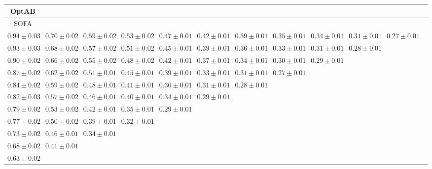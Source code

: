 \begin{table}[ht]
{{\begin{adjustbox}{width=\textwidth}
\begin{tabular}{cccccccccccc}
\hline
OptAB &  &  &  &  &  &  &  &  &  & \\
\hline
SOFA &  &  &  &  &  &  &  &  &  & \\
\hline
$0.94 \pm 0.03$ & $0.70 \pm 0.02$ & $0.59 \pm 0.02$ & $0.53 \pm 0.02$ & $0.47 \pm 0.01$ & $0.42 \pm 0.01$ & $0.39 \pm 0.01$ & $0.35 \pm 0.01$ & $0.34 \pm 0.01$ & $0.31 \pm 0.01$ & $0.27 \pm 0.01$ &  \\
$0.93 \pm 0.03$ & $0.68 \pm 0.02$ & $0.57 \pm 0.02$ & $0.51 \pm 0.02$ & $0.45 \pm 0.01$ & $0.39 \pm 0.01$ & $0.36 \pm 0.01$ & $0.33 \pm 0.01$ & $0.31 \pm 0.01$ & $0.28 \pm 0.01$ &  &  \\
$0.90 \pm 0.02$ & $0.66 \pm 0.02$ & $0.55 \pm 0.02$ & $0.48 \pm 0.02$ & $0.42 \pm 0.01$ & $0.37 \pm 0.01$ & $0.34 \pm 0.01$ & $0.30 \pm 0.01$ & $0.29 \pm 0.01$ &  &  &  \\
$0.87 \pm 0.02$ & $0.62 \pm 0.02$ & $0.51 \pm 0.01$ & $0.45 \pm 0.01$ & $0.39 \pm 0.01$ & $0.33 \pm 0.01$ & $0.31 \pm 0.01$ & $0.27 \pm 0.01$ &  &  &  &  \\
$0.84 \pm 0.02$ & $0.59 \pm 0.02$ & $0.48 \pm 0.01$ & $0.41 \pm 0.01$ & $0.36 \pm 0.01$ & $0.31 \pm 0.01$ & $0.28 \pm 0.01$ &  &  &  &  &  \\
$0.82 \pm 0.03$ & $0.57 \pm 0.02$ & $0.46 \pm 0.01$ & $0.40 \pm 0.01$ & $0.34 \pm 0.01$ & $0.29 \pm 0.01$ &  &  &  &  &  &  \\
$0.79 \pm 0.02$ & $0.53 \pm 0.02$ & $0.42 \pm 0.01$ & $0.35 \pm 0.01$ & $0.29 \pm 0.01$ &  &  &  &  &  &  &  \\
$0.77 \pm 0.02$ & $0.50 \pm 0.02$ & $0.39 \pm 0.01$ & $0.32 \pm 0.01$ &  &  &  &  &  &  &  &  \\
$0.73 \pm 0.02$ & $0.46 \pm 0.01$ & $0.34 \pm 0.01$ &  &  &  &  &  &  &  &  &  \\
$0.68 \pm 0.02$ & $0.41 \pm 0.01$ &  &  &  &  &  &  &  &  &  &  \\
$0.63 \pm 0.02$ &  &  &  &  &  &  &  &  &  &  &  \\



\end{tabular}
\end{adjustbox}}}
\end{table}
